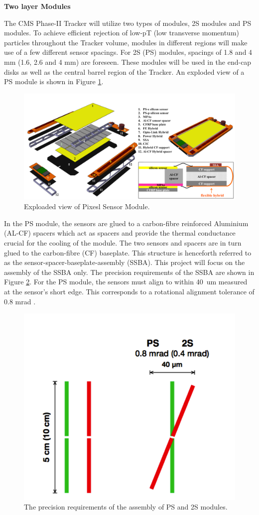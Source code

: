 \textbf{Two layer Modules}

The CMS Phase-II Tracker will utilize two types of modules, 2S modules and PS modules. To achieve efficient rejection of low-pT (low transverse momentum) particles throughout the Tracker volume, modules in different regions will make use of a few different sensor spacings. For 2S (PS) modules, spacings of 1.8 and 4 mm (1.6, 2.6 and 4 mm) are foreseen. These modules will be used in the end-cap disks as well as the central barrel region of the Tracker. An exploded view of a PS module is shown in Figure \ref{fig:ps_exploaded}.
\begin{figure}[ht]\centering
\includegraphics[width=0.8\linewidth]{Data/Introduction/PS_exploaded.png}
\caption{Exploaded view of Pixesl Sensor Module.}
\label{fig:ps_exploaded}
\end{figure}

In the PS module, the sensors are glued to a carbon-fibre reinforced Aluminium (AL-CF) spacers which act as spacers and provide the thermal conductance crucial for the cooling of the module. The two sensors and spacers are in turn glued to the carbon-fibre (CF) baseplate. This structure is henceforth referred to as the sensor-spacer-baseplate-assembly (SSBA). This project will focus on the assembly of the SSBA only. The precision requirements of the SSBA are shown in Figure \ref{fig:ps(2s)_precision}. For the PS module, the sensors must align to within 40~um measured at the sensor’s short edge. This corresponds to a rotational alignment tolerance of 0.8 mrad \cite{AutomatedAssembly_tutorial}.

\begin{figure}[ht]\centering
\includegraphics[width=0.4\linewidth]{Data/Introduction/PS(2S)_precision.png}
\caption{The precision requirements of the assembly of PS
and 2S modules.}
\label{fig:ps(2s)_precision}
\end{figure}
